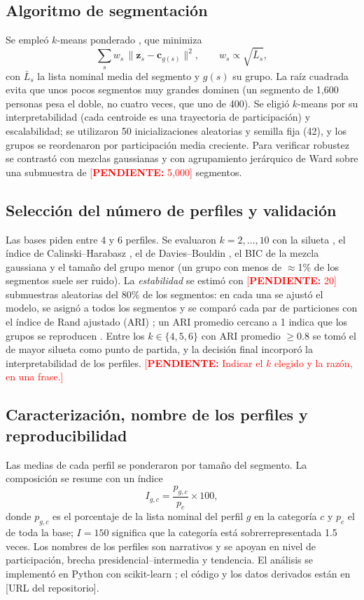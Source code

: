 \documentclass[11pt,letterpaper]{article}
\newcommand{\repositorio}{[URL del repositorio]}
\newcommand{\pend}[1]{\textcolor{red}{[\textbf{PENDIENTE:} #1]}}
\begin{document}
\subsection{Algoritmo de segmentaci\'on}
Se emple\'o $k$-means ponderado \cite{macqueen1967,lloyd1982}, que minimiza
\begin{equation}
  \sum_{s} w_s\,\lVert \mathbf{z}_s-\mathbf{c}_{g(s)}\rVert^2,\qquad w_s\propto\sqrt{\bar L_s},
\end{equation}
con $\bar L_s$ la lista nominal media del segmento y $g(s)$ su grupo. La ra\'iz cuadrada evita que unos pocos segmentos muy grandes dominen (un segmento de 1,600 personas pesa el doble, no cuatro veces, que uno de 400). Se eligi\'o $k$-means por su interpretabilidad (cada centroide es una trayectoria de participaci\'on) y escalabilidad; se utilizaron 50 inicializaciones aleatorias y semilla fija (42), y los grupos se reordenaron por participaci\'on media creciente. Para verificar robustez se contrast\'o con mezclas gaussianas \cite{schwarz1978} y con agrupamiento jer\'arquico de Ward \cite{ward1963} sobre una submuestra de \pend{5,000} segmentos.

\subsection{Selecci\'on del n\'umero de perfiles y validaci\'on}
Las bases piden entre 4 y 6 perfiles. Se evaluaron $k=2,\dots,10$ con la silueta \cite{rousseeuw1987}, el \'indice de Calinski--Harabasz \cite{calinski1974}, el de Davies--Bouldin \cite{davies1979}, el BIC de la mezcla gaussiana \cite{schwarz1978} y el tama\~no del grupo menor (un grupo con menos de $\approx$1\% de los segmentos suele ser ruido). La \emph{estabilidad} se estim\'o con \pend{20} submuestras aleatorias del 80\% de los segmentos: en cada una se ajust\'o el modelo, se asign\'o a todos los segmentos y se compar\'o cada par de particiones con el \'indice de Rand ajustado (ARI) \cite{hubert1985}; un ARI promedio cercano a 1 indica que los grupos se reproducen \cite{hennig2007}. Entre los $k\in\{4,5,6\}$ con ARI promedio $\ge 0.8$ se tom\'o el de mayor silueta como punto de partida, y la decisi\'on final incorpor\'o la interpretabilidad de los perfiles. \pend{Indicar el $k$ elegido y la raz\'on, en una frase.}

\subsection{Caracterizaci\'on, nombre de los perfiles y reproducibilidad}
Las medias de cada perfil se ponderaron por tama\~no del segmento. La composici\'on se resume con un \'indice
\begin{equation}
  I_{g,c}=\frac{p_{g,c}}{p_{c}}\times 100,
\end{equation}
donde $p_{g,c}$ es el porcentaje de la lista nominal del perfil $g$ en la categor\'ia $c$ y $p_c$ el de toda la base; $I=150$ significa que la categor\'ia est\'a sobrerrepresentada 1.5 veces. Los nombres de los perfiles son narrativos y se apoyan en nivel de participaci\'on, brecha presidencial--intermedia y tendencia. El an\'alisis se implement\'o en Python con scikit-learn \cite{pedregosa2011}; el c\'odigo y los datos derivados est\'an en \repositorio.
\end{document}
